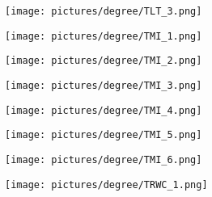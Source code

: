 \begin{figure} \ContinuedFloat
        \centering
        \begin{subfigure}{.49\textwidth}
                \centering
                \texttt{[image: pictures/degree/TLT\_3.png]}
        \end{subfigure}
        \begin{subfigure}{.49\textwidth}
                \centering
                \texttt{[image: pictures/degree/TMI\_1.png]}
        \end{subfigure}
\end{figure}
\begin{figure} \ContinuedFloat
        \centering
        \begin{subfigure}{.49\textwidth}
                \centering
                \texttt{[image: pictures/degree/TMI\_2.png]}
        \end{subfigure}
        \begin{subfigure}{.49\textwidth}
                \centering
                \texttt{[image: pictures/degree/TMI\_3.png]}
        \end{subfigure}
\end{figure}
\begin{figure} \ContinuedFloat
        \centering
        \begin{subfigure}{.49\textwidth}
                \centering
                \texttt{[image: pictures/degree/TMI\_4.png]}
        \end{subfigure}
        \begin{subfigure}{.49\textwidth}
                \centering
                \texttt{[image: pictures/degree/TMI\_5.png]}
        \end{subfigure}
\end{figure}
\begin{figure} \ContinuedFloat
        \centering
        \begin{subfigure}{.49\textwidth}
                \centering
                \texttt{[image: pictures/degree/TMI\_6.png]}
        \end{subfigure}
        \begin{subfigure}{.49\textwidth}
                \centering
                \texttt{[image: pictures/degree/TRWC\_1.png]}
        \end{subfigure}
\end{figure}
